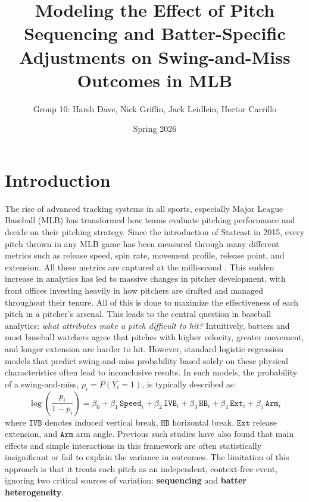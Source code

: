 \documentclass[11pt]{article}
\title{\textbf{Modeling the Effect of Pitch Sequencing and Batter-Specific Adjustments on Swing-and-Miss Outcomes in MLB}}
\author{Group 10: Harsh Dave, Nick Griffin, Jack Leidlein, Hector Carrillo}
\date{Spring 2026}
\begin{document}
\maketitle

\section{Introduction}
The rise of advanced tracking systems in all sports, especially Major League Baseball (MLB) has transformed how teams evaluate pitching performance and decide on their pitching strategy. 
Since the introduction of Statcast in 2015, every pitch thrown in any MLB game has been measured through many different metrics such as release speed, spin rate, movement profile, release point, and extension. 
All these metrics are captured at the millisecond \citep{statcast2024}. 
This sudden increase in analytics has led to massive changes in pitcher development, with front offices investing heavily in how pitchers are drafted and managed throughout their tenure. 
All of this is done to maximize the effectiveness of each pitch in a pitcher's arsenal.
This leads to the central question in baseball analytics: \textit{what attributes make a pitch difficult to hit?} 
Intuitively, batters and most baseball watchers agree that pitches with higher velocity, greater movement, and longer extension are harder to hit.
However, standard logistic regression models that predict swing-and-miss probability based solely on these physical characteristics often lead to inconclusive results. 
In such models, the probability of a swing-and-miss, $p_i = P(Y_i=1)$, is typically described as:
%
\begin{equation}\label{eq:baseline}
    \log\!\left(\frac{p_i}{1 - p_i}\right)
    = \beta_0
    + \beta_1 \,\texttt{Speed}_i
    + \beta_2 \,\texttt{IVB}_i
    + \beta_3 \,\texttt{HB}_i
    + \beta_4 \,\texttt{Ext}_i
    + \beta_5 \,\texttt{Arm}_i
\end{equation}
%
where $\texttt{IVB}$ denotes induced vertical break, $\texttt{HB}$ horizontal break, $\texttt{Ext}$ release extension, and $\texttt{Arm}$ arm angle.
Previous such studies have also found that main effects and simple interactions in this framework are often statistically insignificant or fail to explain the variance in outcomes. 
The limitation of this approach is that it treats each pitch as an independent, context-free event, ignoring two critical sources of variation: \textbf{sequencing} and \textbf{batter heterogeneity}.
\end{document}
